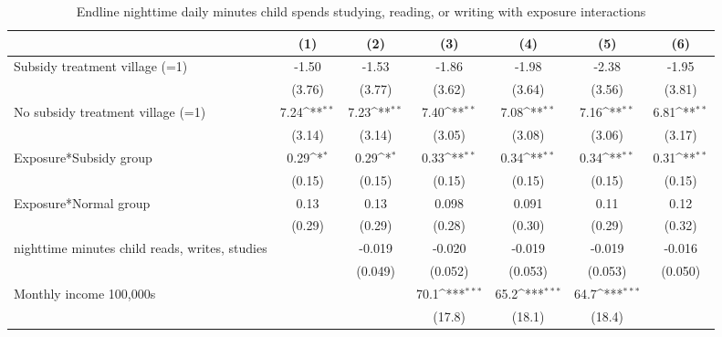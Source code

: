 \begin{table}[htbp]\centering
\def\sym#1{\ifmmode^{#1}\else\(^{#1}\)\fi}
\caption{Endline nighttime daily minutes child spends studying, reading, or writing with exposure interactions}
\begin{tabular*}{1\hsize}{@{\hskip\tabcolsep\extracolsep\fill}l*{6}{c}}
\toprule
                &\multicolumn{1}{c}{(1)}         &\multicolumn{1}{c}{(2)}         &\multicolumn{1}{c}{(3)}         &\multicolumn{1}{c}{(4)}         &\multicolumn{1}{c}{(5)}         &\multicolumn{1}{c}{(6)}         \\
\midrule
Subsidy treatment village (=1)&    -1.50         &    -1.53         &    -1.86         &    -1.98         &    -2.38         &    -1.95         \\
                &   (3.76)         &   (3.77)         &   (3.62)         &   (3.64)         &   (3.56)         &   (3.81)         \\
No subsidy treatment village (=1)&     7.24\sym{**} &     7.23\sym{**} &     7.40\sym{**} &     7.08\sym{**} &     7.16\sym{**} &     6.81\sym{**} \\
                &   (3.14)         &   (3.14)         &   (3.05)         &   (3.08)         &   (3.06)         &   (3.17)         \\
Exposure*Subsidy group&     0.29\sym{*}  &     0.29\sym{*}  &     0.33\sym{**} &     0.34\sym{**} &     0.34\sym{**} &     0.31\sym{**} \\
                &   (0.15)         &   (0.15)         &   (0.15)         &   (0.15)         &   (0.15)         &   (0.15)         \\
Exposure*Normal group&     0.13         &     0.13         &    0.098         &    0.091         &     0.11         &     0.12         \\
                &   (0.29)         &   (0.29)         &   (0.28)         &   (0.30)         &   (0.29)         &   (0.32)         \\
nighttime minutes child reads, writes, studies&                  &   -0.019         &   -0.020         &   -0.019         &   -0.019         &   -0.016         \\
                &                  &  (0.049)         &  (0.052)         &  (0.053)         &  (0.053)         &  (0.050)         \\
Monthly income 100,000s&                  &                  &     70.1\sym{***}&     65.2\sym{***}&     64.7\sym{***}&                  \\
                &                  &                  &   (17.8)         &   (18.1)         &   (18.4)         &                  \\

\end{tabular*}
\end{table}
